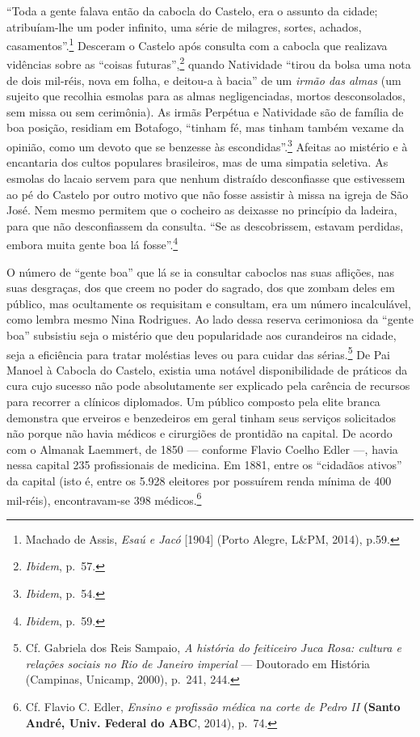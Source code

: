 ``Toda a gente falava então da cabocla do Castelo, era o assunto da
cidade; atribuíam-lhe um poder infinito, uma série de milagres, sortes,
achados, casamentos''.\footnote{Machado de Assis, \textit{Esaú e Jacó}
  {[}1904{]} (Porto Alegre, L\&PM, 2014), p.59.} Desceram o Castelo após
consulta com a cabocla que realizava vidências sobre as ``coisas
futuras'',\footnote{\textit{Ibidem}, p.~57.} quando Natividade ``tirou da
bolsa uma nota de dois mil-réis, nova em folha, e deitou-a à bacia'' de
um \textit{irmão das almas} (um sujeito que recolhia esmolas para as almas
negligenciadas, mortos desconsolados, sem missa ou sem cerimônia). As
irmãs Perpétua e Natividade são de família de boa posição, residiam em
Botafogo, ``tinham fé, mas tinham também vexame da opinião, como um
devoto que se benzesse às escondidas''.\footnote{\textit{Ibidem}, p.~54.}
Afeitas ao mistério e à encantaria dos cultos populares brasileiros, mas
de uma simpatia seletiva. As esmolas do lacaio servem para que nenhum
distraído desconfiasse que estivessem ao pé do Castelo por outro motivo
que não fosse assistir à missa na igreja de São José. Nem mesmo permitem
que o cocheiro as deixasse no princípio da ladeira, para que não
desconfiassem da consulta. ``Se as descobrissem, estavam perdidas,
embora muita gente boa lá fosse''.\footnote{\textit{Ibidem}, p.~59.}

O número de ``gente boa'' que lá se ia consultar caboclos nas suas
aflições, nas suas desgraças, dos que creem no poder do sagrado, dos que
zombam deles em público, mas ocultamente os requisitam e consultam, era
um número incalculável, como lembra mesmo Nina Rodrigues. Ao lado dessa
reserva cerimoniosa da ``gente boa'' subsistiu seja o mistério que deu
popularidade aos curandeiros na cidade, seja a eficiência para tratar
moléstias leves ou para cuidar das sérias.\footnote{Cf. Gabriela dos
  Reis Sampaio, \textit{A história do feiticeiro Juca Rosa: cultura e
  relações sociais no Rio de Janeiro imperial} --- Doutorado em História
  (Campinas, Unicamp, 2000), p.~241, 244.} De Pai Manoel à Cabocla do
Castelo, existia uma notável disponibilidade de práticos da cura cujo
sucesso não pode absolutamente ser explicado pela carência de recursos
para recorrer a clínicos diplomados. Um público composto pela elite
branca demonstra que erveiros e benzedeiros em geral tinham seus
serviços solicitados não porque não havia médicos e cirurgiões de
prontidão na capital. De acordo com o Almanak Laemmert, de 1850 ---
conforme Flavio Coelho Edler ---, havia nessa capital 235 profissionais
de medicina. Em 1881, entre os ``cidadãos ativos'' da capital (isto é,
entre os 5.928 eleitores por possuírem renda mínima de 400 mil-réis),
encontravam-se 398 médicos.\footnote{Cf. Flavio C. Edler, \textit{Ensino e
  profissão médica na corte de Pedro II} \textbf{(Santo André, Univ.
  Federal do ABC}, 2014), p.~74.}


